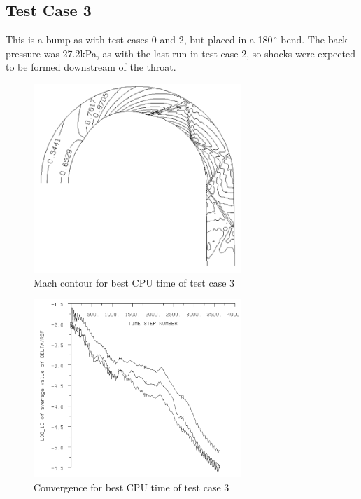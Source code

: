 \documentclass[12pt, a4paper]{article}
\begin{document}
\subsection{Test Case 3}
This is a bump as with test cases 0 and 2, but placed in a 180$\,^{\circ}$ bend. The back pressure was 27.2kPa, as with the last run in test case 2, so shocks were expected to be formed downstream of the throat.
\begin{figure}[H]
	\centering
	\includegraphics[width=0.7\textwidth]{plots/3.1 mach}
	\caption{Mach contour for  best CPU time of test case 3}
	\label{fig:3.1mach}
\end{figure}
\begin{figure}[H]
	\centering
	\includegraphics[width=0.7\textwidth]{plots/3.1 conv}
	\caption{Convergence for  best CPU time of test case 3}
	\label{fig:3.1conv}
\end{figure}
\end{document}
